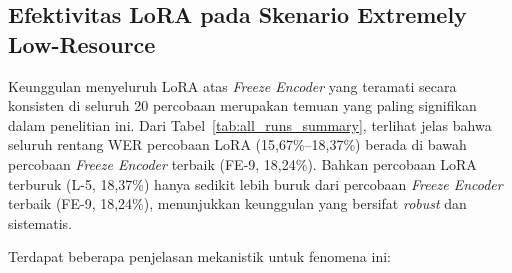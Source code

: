 \subsection{Efektivitas LoRA pada Skenario Extremely Low-Resource}

Keunggulan menyeluruh LoRA atas \textit{Freeze Encoder} yang teramati secara konsisten di seluruh 20 percobaan merupakan temuan yang paling signifikan dalam penelitian ini. Dari Tabel~\ref{tab:all_runs_summary}, terlihat jelas bahwa seluruh rentang WER percobaan LoRA (15,67\%--18,37\%) berada di bawah percobaan \textit{Freeze Encoder} terbaik (FE-9, 18,24\%). Bahkan percobaan LoRA terburuk (L-5, 18,37\%) hanya sedikit lebih buruk dari percobaan \textit{Freeze Encoder} terbaik (FE-9, 18,24\%), menunjukkan keunggulan yang bersifat \textit{robust} dan sistematis.

Terdapat beberapa penjelasan mekanistik untuk fenomena ini:

